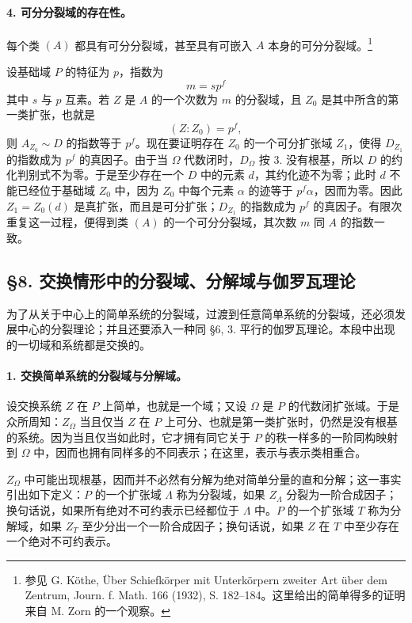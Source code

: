\paragraph{4. 可分分裂域的存在性。}
每个类 \((A)\) 都具有可分分裂域，甚至具有可嵌入 \(A\) 本身的可分分裂域。\footnote{参见 G. Köthe, Über Schiefkörper mit Unterkörpern zweiter Art über dem Zentrum, Journ. f. Math. 166 (1932), S. 182--184。这里给出的简单得多的证明来自 M. Zorn 的一个观察。}

设基础域 \(P\) 的特征为 \(p\)，指数为
\[
        m=s p^f
\]
其中 \(s\) 与 \(p\) 互素。若 \(Z\) 是 \(A\) 的一个次数为 \(m\) 的分裂域，且 \(Z_0\) 是其中所含的第一类扩张，也就是
\[
        (Z:Z_0)=p^f,
\]
则 \(A_{Z_0}\sim D\) 的指数等于 \(p^f\)。现在要证明存在 \(Z_0\) 的一个可分扩张域 \(Z_1\)，使得 \(D_{Z_1}\) 的指数成为 \(p^f\) 的真因子。由于当 \(\Omega\) 代数闭时，\(D_\Omega\) 按 3. 没有根基，所以 \(D\) 的约化判别式不为零。于是至少存在一个 \(D\) 中的元素 \(d\)，其约化迹不为零；此时 \(d\) 不能已经位于基础域 \(Z_0\) 中，因为 \(Z_0\) 中每个元素 \(\alpha\) 的迹等于 \(p^f\alpha\)，因而为零。因此 \(Z_1=Z_0(d)\) 是真扩张，而且是可分扩张；\(D_{Z_1}\) 的指数成为 \(p^f\) 的真因子。有限次重复这一过程，便得到类 \((A)\) 的一个可分分裂域，其次数 \(m\) 同 \(A\) 的指数一致。

\subsection*{§8. 交换情形中的分裂域、分解域与伽罗瓦理论}

为了从关于中心上的简单系统的分裂域，过渡到任意简单系统的分裂域，还必须发展中心的分裂理论；并且还要添入一种同 §6, 3. 平行的伽罗瓦理论。本段中出现的一切域和系统都是交换的。

\paragraph{1. 交换简单系统的分裂域与分解域。}
设交换系统 \(Z\) 在 \(P\) 上简单，也就是一个域；又设 \(\Omega\) 是 \(P\) 的代数闭扩张域。于是众所周知：\(Z_\Omega\) 当且仅当 \(Z\) 在 \(P\) 上可分、也就是第一类扩张时，仍然是没有根基的系统。因为当且仅当如此时，它才拥有同它关于 \(P\) 的秩一样多的一阶同构映射到 \(\Omega\) 中，因而也拥有同样多的不同表示；在这里，表示与表示类相重合。

\(Z_\Omega\) 中可能出现根基，因而并不必然有分解为绝对简单分量的直和分解；这一事实引出如下定义：\(P\) 的一个扩张域 \(\Lambda\) 称为分裂域，如果 \(Z_\Lambda\) 分裂为一阶合成因子；换句话说，如果所有绝对不可约表示已经都位于 \(\Lambda\) 中。\(P\) 的一个扩张域 \(T\) 称为分解域，如果 \(Z_T\) 至少分出一个一阶合成因子；换句话说，如果 \(Z\) 在 \(T\) 中至少存在一个绝对不可约表示。

